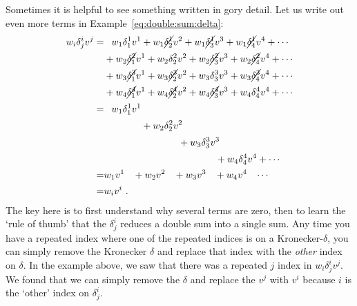 \documentclass[12pt, oneside]{report}    %
\begin{document}
\begin{subappendices}
\begin{example}
Sometimes it is helpful to see something written in gory detail. Let us write out even more terms in Example~\ref{eq:double:sum:delta}:
\begin{align}
    w_i \delta^i_j v^j = 
    &
    \pp w_1 \delta^1_1 v^1 
    + w_1 \cancel{\delta^1_2} v^2 
    + w_1 \cancel{\delta^1_3} v^3 
    + w_1 \cancel{\delta^1_4} v^4 
    + \cdots 
    \\
    & 
    + w_2 \cancel{\delta^2_1} v^1
    + w_2 {\delta^2_2} v^2 
    + w_2 \cancel{\delta^2_3} v^3 
    + w_2 \cancel{\delta^2_4} v^4 
    + \cdots 
    \\    & 
    + w_3 \cancel{\delta^3_1} v^1
    + w_3 \cancel{\delta^3_2} v^2 
    + w_3 {\delta^3_3} v^3 
    + w_3 \cancel{\delta^3_4} v^4 
    + \cdots 
    \\    & 
    + w_4 \cancel{\delta^4_1} v^1
    + w_4 \cancel{\delta^4_2} v^2 
    + w_4 \cancel{\delta^4_3} v^3 
    + w_4 {\delta^4_4} v^4 
    + \cdots 
    \\
    = &
    \pp w_1 \delta^1_1 v^1 
    \phantom{+ w_1 \cancel{\delta^1_2} v^2 }
    \phantom{+ w_1 \cancel{\delta^1_3} v^3 }
    \phantom{+ w_1 \cancel{\delta^1_4} v^4 }
    \phantom{+ \cdots }
    \\
    & 
    \phantom{+ w_2 \cancel{\delta^2_1} v^1}
    + w_2 {\delta^2_2} v^2 
    \phantom{+ w_2 \cancel{\delta^2_3} v^3 }
    \phantom{+ w_2 \cancel{\delta^2_4} v^4 }
    \phantom{+ \cdots }
    \\    & 
    \phantom{+ w_3 \cancel{\delta^3_1} v^1}
    \phantom{+ w_3 \cancel{\delta^3_2} v^2 }
    + w_3 {\delta^3_3} v^3 
    \phantom{+ w_3 \cancel{\delta^3_4} v^4 }
    \phantom{+ \cdots }
    \\    & 
    \phantom{+ w_4 \cancel{\delta^4_1} v^1}
    \phantom{+ w_4 \cancel{\delta^4_2} v^2 }
    \phantom{+ w_4 \cancel{\delta^4_3} v^3 }
    + w_4 {\delta^4_4} v^4 
    + \cdots 
    \\
    =& w_1v^1\phantom{\delta^i_j} + w_2 v^2\phantom{\delta^i_j} + w_3 v^3\phantom{\delta^i_j} + w_4 v^4\phantom{\delta^i_j} \cdots 
    \\=& w_iv^i 
    \ .
\end{align}
The key here is to first understand why several terms are zero, then to learn the `rule of thumb' that the $\delta^i_j$ reduces a double sum into a single sum. Any time you have a repeated index where one of the repeated indices is on a Kronecker-$\delta$, you can simply remove the Kronecker $\delta$ and replace that index with the \emph{other} index on $\delta$. In the example above, we saw that there was a repeated $j$ index in $w_i \delta^i_j v^j$. We found that we can simply remove the $\delta$ and replace the $v^j$ with $v^i$ because $i$ is the `other' index on $\delta^i_j$.
\end{example}


\end{subappendices}
\end{document}
